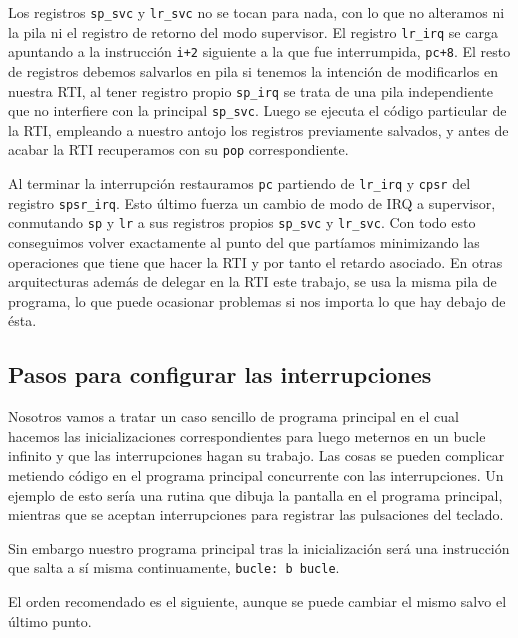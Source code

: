 Los registros {\tt sp\_svc} y {\tt lr\_svc} no se tocan para nada, con lo que no alteramos ni la
pila ni el registro de retorno del modo supervisor. El registro {\tt lr\_irq} se carga apuntando a la
instrucción {\tt i+2} siguiente a la que fue interrumpida, {\tt pc+8}. El resto de registros debemos salvarlos en pila si tenemos la intención
de modificarlos en nuestra RTI, al tener registro propio {\tt sp\_irq} se trata de una pila
independiente que no interfiere con la principal {\tt sp\_svc}. Luego se ejecuta el código
particular de la RTI, empleando a nuestro antojo los registros previamente salvados, y antes de
acabar la RTI recuperamos con su {\tt pop} correspondiente.

Al terminar la interrupción restauramos {\tt pc} partiendo de {\tt lr\_irq} y {\tt cpsr} del registro
{\tt spsr\_irq}. Esto último fuerza un cambio de modo de IRQ a supervisor, conmutando {\tt sp} y {\tt lr}
a sus registros propios {\tt sp\_svc} y {\tt lr\_svc}. Con todo esto conseguimos volver exactamente
al punto del que partíamos minimizando las
operaciones que tiene que hacer la RTI y por tanto el retardo asociado. En otras arquitecturas
además de delegar en la RTI este trabajo, se usa la misma pila de programa, lo que puede
ocasionar problemas si nos importa lo que hay debajo de ésta.

\subsection{Pasos para configurar las interrupciones}

Nosotros vamos a tratar un caso sencillo de programa principal en el cual hacemos las
inicializaciones correspondientes para luego meternos en un bucle infinito y que las
interrupciones hagan su trabajo. Las cosas se pueden complicar metiendo código en
el programa principal concurrente con las interrupciones. Un ejemplo de esto sería
una rutina que dibuja la pantalla en el programa principal, mientras que se aceptan
interrupciones para registrar las pulsaciones del teclado.

Sin embargo nuestro programa principal tras la inicialización será una
instrucción que salta a sí misma continuamente, {\tt bucle: b bucle}.

El orden recomendado es el siguiente, aunque se puede cambiar el mismo salvo el último punto.

